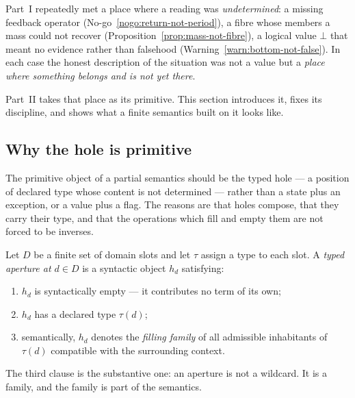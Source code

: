 \label{sec:apertures-body}

Part~I repeatedly met a place where a reading was \emph{undetermined}: a missing
feedback operator (No-go~\ref{nogo:return-not-period}), a fibre whose members a mass could
not recover (Proposition~\ref{prop:mass-not-fibre}), a logical value $\bot$ that meant no
evidence rather than falsehood (Warning~\ref{warn:bottom-not-false}).  In each case the
honest description of the situation was not a value but a \emph{place where something
belongs and is not yet there}.

Part~II takes that place as its primitive.  This section introduces it, fixes its
discipline, and shows what a finite semantics built on it looks like.

\subsection{Why the hole is primitive}

\begin{proposal}\label{prop:aperture-first}
The primitive object of a partial semantics should be the typed hole --- a position of
declared type whose content is not determined --- rather than a state plus an
exception, or a value plus a flag.  The reasons are that holes compose, that they carry
their type, and that the operations which fill and empty them are not forced to be
inverses.
\end{proposal}

\begin{definition}\label{def:aperture}
Let $D$ be a finite set of domain slots and let $\tau$ assign a type to each slot.  A
\emph{typed aperture at $d\in D$} is a syntactic object $h_d$ satisfying:
\begin{enumerate}
\item $h_d$ is syntactically empty --- it contributes no term of its own;
\item $h_d$ has a declared type $\tau(d)$;
\item semantically, $h_d$ denotes the \emph{filling family} of all admissible inhabitants
  of $\tau(d)$ compatible with the surrounding context.
\end{enumerate}
\end{definition}

The third clause is the substantive one: an aperture is not a wildcard.  It is a family,
and the family is part of the semantics.

